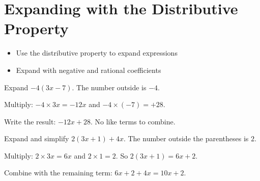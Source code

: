 \section{Expanding with the Distributive Property}

\begin{stepGoal}
\begin{itemize}
    \item Use the distributive property to expand expressions
    \item Expand with negative and rational coefficients
\end{itemize}
\end{stepGoal}

\begin{stepVocabBox}
\end{stepVocabBox}

\begin{stepsCard}
\end{stepsCard}

\begin{stepExample}{Expand $-4(3x - 7)$.}
     The number outside is $-4$.

     Multiply: $-4 \times 3x = -12x$ and $-4 \times (-7) = +28$.

     Write the result: $-12x + 28$. No like terms to combine.
\end{stepExample}

\begin{stepExample}{Expand and simplify $2(3x + 1) + 4x$.}
     The number outside the parentheses is $2$.

     Multiply: $2 \times 3x = 6x$ and $2 \times 1 = 2$. So $2(3x + 1) = 6x + 2$.

     Combine with the remaining term: $6x + 2 + 4x = 10x + 2$.
\end{stepExample}

